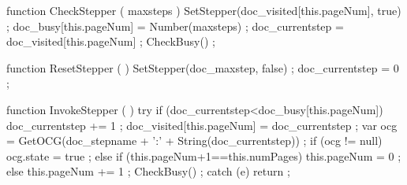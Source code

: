     function CheckStepper ( maxsteps ) {
        SetStepper(doc_visited[this.pageNum], true) ;
        doc_busy[this.pageNum] = Number(maxsteps) ;
        doc_currentstep = doc_visited[this.pageNum] ;
        CheckBusy() ;
    }

    function ResetStepper ( ) {
        SetStepper(doc_maxstep, false) ;
        doc_currentstep = 0 ;
    }

    function InvokeStepper ( ) {
        try {
            if (doc_currentstep<doc_busy[this.pageNum]) {
                doc_currentstep += 1 ;
                doc_visited[this.pageNum] = doc_currentstep ;
                var ocg = GetOCG(doc_stepname + ':' + String(doc_currentstep)) ;
                if (ocg != null) {
                    ocg.state = true ;
                }
            } else {
                if (this.pageNum+1==this.numPages) {
                    this.pageNum  = 0 ;
                } else {
                    this.pageNum += 1 ;
                }
            }
            CheckBusy() ;
        } catch (e) {
            return ;
        }
    }

\stopJSpreamble


\endinput

